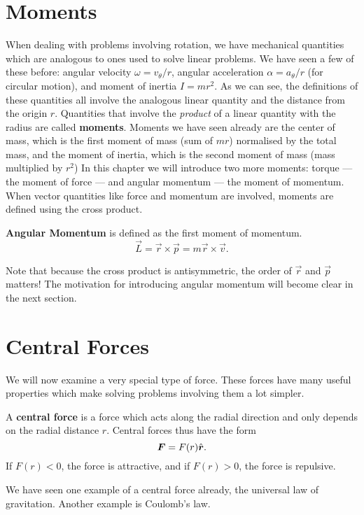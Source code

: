 \documentclass[../classical_mechanics.tex]{subfiles}
\begin{document}

    \section{Moments}\label{sec:moments}
        When dealing with problems involving rotation, we have mechanical quantities which are analogous to ones used to solve linear problems.
        We have seen a few of these before: angular velocity $\omega=v_\theta/r$, angular acceleration $\alpha=a_\theta/r$ (for circular motion), and moment of inertia $I=mr^2$.
        As we can see, the definitions of these quantities all involve the analogous linear quantity and the distance from the origin $r$.
        Quantities that involve the \textit{product} of a linear quantity with the radius are called \textbf{moments}.
        Moments we have seen already are the center of mass, which is the first moment of mass (sum of $mr$) normalised by the total mass, and the moment of inertia, which is the second moment of mass (mass multiplied by $r^2$)
        In this chapter we will introduce two more moments: torque --- the moment of force --- and angular momentum --- the moment of momentum.
        When vector quantities like force and momentum are involved, moments are defined using the cross product.
        \begin{definition}
            \textbf{Angular Momentum} is defined as the first moment of momentum.
            \begin{equation}
                \vec{L}=\vec{r}\times\vec{p}=m\vec{r}\times\vec{v}.
            \end{equation}
        \end{definition}
        Note that because the cross product is antisymmetric, the order of $\vec{r}$ and $\vec{p}$ matters!
        The motivation for introducing angular momentum will become clear in the next section. 

    \section{Central Forces}\label{sec:central-forces}
        We will now examine a very special type of force.
        These forces have many useful properties which make solving problems involving them a lot simpler.
        \begin{definition}
            A \textbf{central force} is a force which acts along the radial direction and only depends on the radial distance $r$.
            Central forces thus have the form
            \begin{equation}
                \boldsymbol{F}=F(r)\hat{\boldsymbol{r}}.
            \end{equation}
            If $F(r)<0$, the force is attractive, and if $F(r)>0$, the force is repulsive.
        \end{definition}
        We have seen one example of a central force already, the universal law of gravitation.
        Another example is Coulomb's law.
\end{document}
